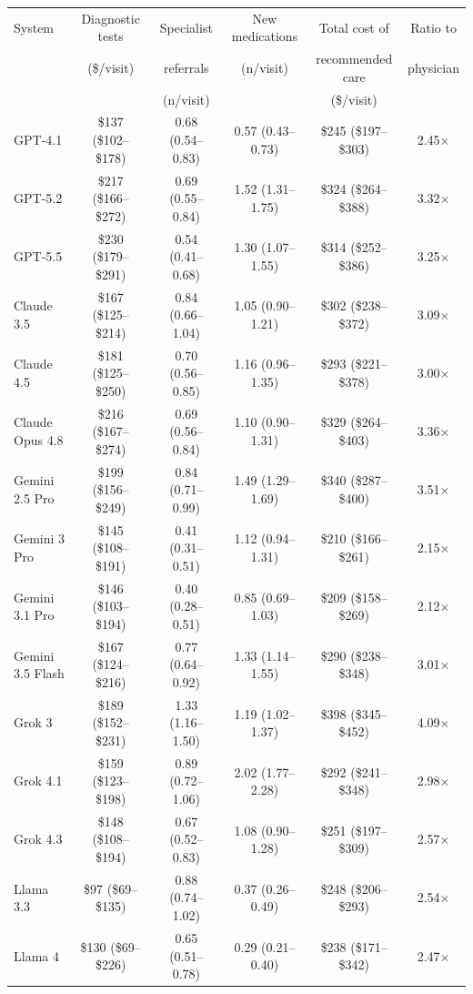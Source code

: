 \begin{tabular}{l c c c c c}
\toprule
System & Diagnostic tests & Specialist & New medications & Total cost of & Ratio to \\
 & (\$/visit) & referrals & (n/visit) & recommended care & physician \\
 & & (n/visit) & & (\$/visit) & \\
\midrule
GPT-4.1 & \$137 (\$102--\$178) & 0.68 (0.54--0.83) & 0.57 (0.43--0.73) & \$245 (\$197--\$303) & 2.45$\times$ \\
GPT-5.2 & \$217 (\$166--\$272) & 0.69 (0.55--0.84) & 1.52 (1.31--1.75) & \$324 (\$264--\$388) & 3.32$\times$ \\
GPT-5.5 & \$230 (\$179--\$291) & 0.54 (0.41--0.68) & 1.30 (1.07--1.55) & \$314 (\$252--\$386) & 3.25$\times$ \\
Claude 3.5 & \$167 (\$125--\$214) & 0.84 (0.66--1.04) & 1.05 (0.90--1.21) & \$302 (\$238--\$372) & 3.09$\times$ \\
Claude 4.5 & \$181 (\$125--\$250) & 0.70 (0.56--0.85) & 1.16 (0.96--1.35) & \$293 (\$221--\$378) & 3.00$\times$ \\
Claude Opus 4.8 & \$216 (\$167--\$274) & 0.69 (0.56--0.84) & 1.10 (0.90--1.31) & \$329 (\$264--\$403) & 3.36$\times$ \\
Gemini 2.5 Pro & \$199 (\$156--\$249) & 0.84 (0.71--0.99) & 1.49 (1.29--1.69) & \$340 (\$287--\$400) & 3.51$\times$ \\
Gemini 3 Pro & \$145 (\$108--\$191) & 0.41 (0.31--0.51) & 1.12 (0.94--1.31) & \$210 (\$166--\$261) & 2.15$\times$ \\
Gemini 3.1 Pro & \$146 (\$103--\$194) & 0.40 (0.28--0.51) & 0.85 (0.69--1.03) & \$209 (\$158--\$269) & 2.12$\times$ \\
Gemini 3.5 Flash & \$167 (\$124--\$216) & 0.77 (0.64--0.92) & 1.33 (1.14--1.55) & \$290 (\$238--\$348) & 3.01$\times$ \\
Grok 3 & \$189 (\$152--\$231) & 1.33 (1.16--1.50) & 1.19 (1.02--1.37) & \$398 (\$345--\$452) & 4.09$\times$ \\
Grok 4.1 & \$159 (\$123--\$198) & 0.89 (0.72--1.06) & 2.02 (1.77--2.28) & \$292 (\$241--\$348) & 2.98$\times$ \\
Grok 4.3 & \$148 (\$108--\$194) & 0.67 (0.52--0.83) & 1.08 (0.90--1.28) & \$251 (\$197--\$309) & 2.57$\times$ \\
Llama 3.3 & \$97 (\$69--\$135) & 0.88 (0.74--1.02) & 0.37 (0.26--0.49) & \$248 (\$206--\$293) & 2.54$\times$ \\
Llama 4 & \$130 (\$69--\$226) & 0.65 (0.51--0.78) & 0.29 (0.21--0.40) & \$238 (\$171--\$342) & 2.47$\times$ \\

\end{tabular}
